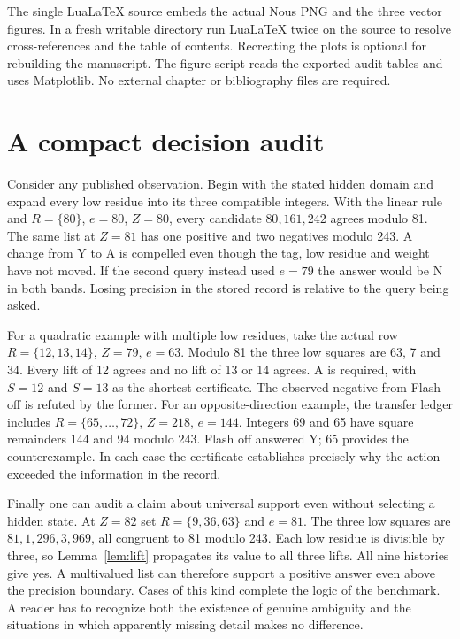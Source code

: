 \documentclass[12pt,letterpaper]{article}
\begin{document}
The single LuaLaTeX source embeds the actual Nous PNG and the three vector figures. In a fresh writable directory run LuaLaTeX twice on the source to resolve cross-references and the table of contents. Recreating the plots is optional for rebuilding the manuscript. The figure script reads the exported audit tables and uses Matplotlib. No external chapter or bibliography files are required.

\section{A compact decision audit}\label{sec:quick}
Consider any published observation. Begin with the stated hidden domain and expand every low residue into its three compatible integers. With the linear rule and $R=\{80\}$, $e=80$, $Z=80$, every candidate $80,161,242$ agrees modulo 81. The same list at $Z=81$ has one positive and two negatives modulo 243. A change from Y to A is compelled even though the tag, low residue and weight have not moved. If the second query instead used $e=79$ the answer would be N in both bands. Losing precision in the stored record is relative to the query being asked.

For a quadratic example with multiple low residues, take the actual row $R=\{12,13,14\}$, $Z=79$, $e=63$. Modulo 81 the three low squares are 63, 7 and 34. Every lift of 12 agrees and no lift of 13 or 14 agrees. A is required, with $S=12$ and $S=13$ as the shortest certificate. The observed negative from Flash off is refuted by the former. For an opposite-direction example, the transfer ledger includes $R=\{65,\ldots,72\}$, $Z=218$, $e=144$. Integers 69 and 65 have square remainders 144 and 94 modulo 243. Flash off answered Y; 65 provides the counterexample. In each case the certificate establishes precisely why the action exceeded the information in the record.

Finally one can audit a claim about universal support even without selecting a hidden state. At $Z=82$ set $R=\{9,36,63\}$ and $e=81$. The three low squares are $81,1{,}296,3{,}969$, all congruent to 81 modulo 243. Each low residue is divisible by three, so Lemma~\ref{lem:lift} propagates its value to all three lifts. All nine histories give yes. A multivalued list can therefore support a positive answer even above the precision boundary. Cases of this kind complete the logic of the benchmark. A reader has to recognize both the existence of genuine ambiguity and the situations in which apparently missing detail makes no difference.
\end{document}
